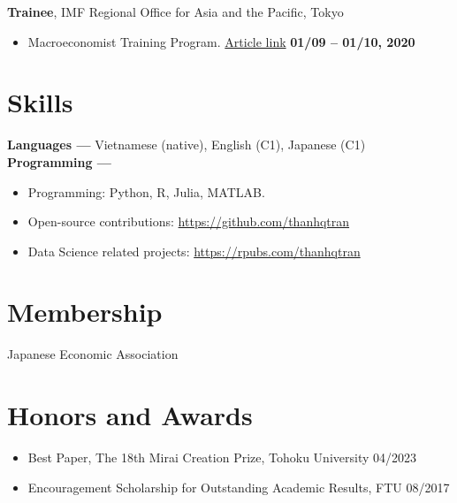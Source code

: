\documentclass[margin,line]{res}
\begin{document}
\begin{resume}
\vspace*{.05in}
{\bf Trainee}, IMF Regional Office for Asia and the Pacific, Tokyo
\vspace*{.05in}
\begin{itemize}
\item[ ] Macroeconomist Training Program. \href{https://www.imf.org/en/Countries/ResRep/OAP-Home/~/link.aspx?_id=C2F64E8412B64A86BD37DDEB8439312B&_z=z}{Article link} \hfill {\bf 01/09 -- 01/10, 2020}
\end{itemize}

\vspace{4mm}








\section{\sc Skills}
{\bf Languages ---}
\vspace*{.05in}
Vietnamese (native), English (C1), Japanese (C1)\\
{\bf Programming ---}
\vspace*{.05in}
\begin{itemize}
	\item Programming: Python, R, Julia, MATLAB.
	\item Open-source contributions: \url{https://github.com/thanhqtran}
	\item Data Science related projects: \url{https://rpubs.com/thanhqtran}
\end{itemize}

\vspace{4mm}

\section{\sc Membership}
 Japanese Economic Association \\

\section{\sc Honors and Awards}
\begin{itemize}
\item[] Best Paper, The 18th Mirai Creation Prize, Tohoku University \hfill 04/2023
\item[] Encouragement Scholarship for Outstanding Academic Results, FTU \hfill 08/2017
\end{itemize}


\end{resume}
\end{document}
